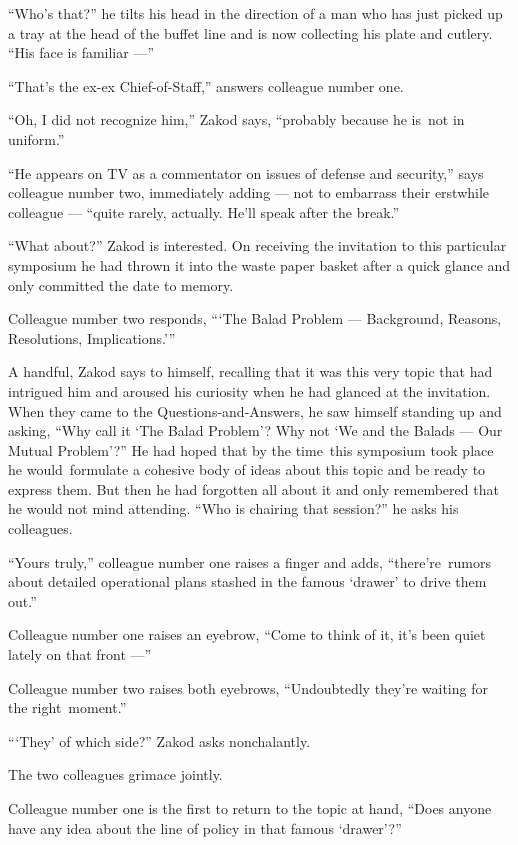 \documentclass[twoside,11pt,openany]{book}
\begin{document}
``Who's that?'' he tilts his head in the direction of a man who has just picked up a tray at
the head of the buffet line and is now collecting his plate and cutlery. ``His face is familiar ---''

``That's the ex-ex Chief-of-Staff,'' answers colleague number one.

``Oh, I did not recognize him,'' Zakod says, ``probably because he is~not in
uniform.''

``He appears on TV as a commentator on issues of defense and security,'' says colleague number
two, immediately adding --- not to embarrass their erstwhile colleague --- ``quite rarely, actually. He'll
speak after the break.''

``What about?'' Zakod is interested. On receiving the invitation to this particular symposium
he had thrown it into the waste paper basket after a quick glance and only committed the date to memory.

Colleague number two responds, ``{\thinspace}`The Balad Problem --- Background, Reasons, Resolutions,
Implications.'\thinspace''

A handful, Zakod says to himself, recalling that it was this very topic that had intrigued him and aroused his curiosity
when he had glanced at the invitation. When they{ }came{ }to
the Questions-and-Answers{, }he saw himself standing up and asking, ``Why call it `The
Balad Problem'? Why not `We and the Balads --- Our Mutual Problem'?'' He had hoped that by the time~this
symposium{ }took place he would~formulate a cohesive body of ideas about this topic and be ready to
express them. But then he had forgotten all about it and only remembered that he would not mind attending.
``Who is chairing that session?'' he asks his colleagues.

``Yours truly,'' colleague number one raises a finger and adds, ``there're~rumors
about detailed operational plans stashed in the famous `drawer' to drive them out.''

Colleague number one raises an eyebrow, ``Come to think of it, it's been quiet lately on that front ---''

Colleague number two raises both eyebrows, ``Undoubtedly they're waiting for the
right~moment.''

``{\thinspace}`They' of which side?'' Zakod asks nonchalantly.

The two colleagues grimace jointly.

Colleague number one is the first to return to the topic at hand, ``Does anyone have any idea about the
line of policy in that famous `drawer{}'?''
\end{document}
